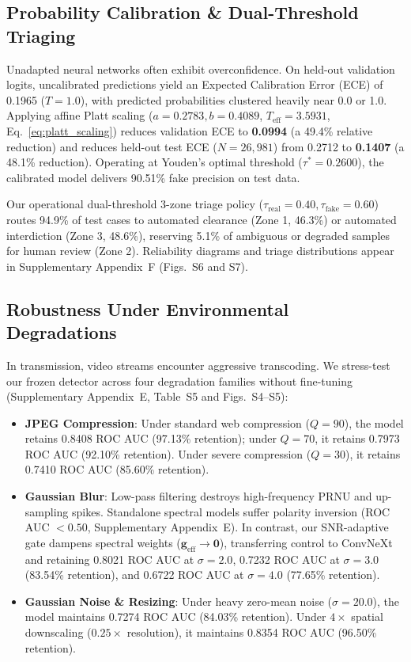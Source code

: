 \documentclass[10pt,twocolumn,letterpaper]{article}
\begin{document}
\subsection{Probability Calibration \& Dual-Threshold Triaging}
\label{sec:exp_calibration}

Unadapted neural networks often exhibit overconfidence. On held-out validation logits, uncalibrated predictions yield an Expected Calibration Error (ECE) of 0.1965 ($T = 1.0$), with predicted probabilities clustered heavily near 0.0 or 1.0. Applying affine Platt scaling ($a = 0.2783, b = 0.4089$, $T_{\mathrm{eff}} = 3.5931$, Eq.~\ref{eq:platt_scaling}) reduces validation ECE to \textbf{0.0994} (a 49.4\% relative reduction) and reduces held-out test ECE ($N = 26,981$) from 0.2712 to \textbf{0.1407} (a 48.1\% reduction). Operating at Youden's optimal threshold ($\tau^* = 0.2600$), the calibrated model delivers 90.51\% fake precision on test data.

Our operational dual-threshold 3-zone triage policy ($\tau_{\mathrm{real}} = 0.40, \tau_{\mathrm{fake}} = 0.60$) routes 94.9\% of test cases to automated clearance (Zone 1, 46.3\%) or automated interdiction (Zone 3, 48.6\%), reserving 5.1\% of ambiguous or degraded samples for human review (Zone 2). Reliability diagrams and triage distributions appear in Supplementary Appendix~F (Figs.~S6 and S7).

\subsection{Robustness Under Environmental Degradations}
\label{sec:exp_robustness}

In transmission, video streams encounter aggressive transcoding. We stress-test our frozen detector across four degradation families without fine-tuning (Supplementary Appendix~E, Table~S5 and Figs.~S4--S5):
\begin{itemize}
\item \textbf{JPEG Compression}: Under standard web compression ($Q = 90$), the model retains 0.8408 ROC AUC (97.13\% retention); under $Q = 70$, it retains 0.7973 ROC AUC (92.10\% retention). Under severe compression ($Q = 30$), it retains 0.7410 ROC AUC (85.60\% retention).
\item \textbf{Gaussian Blur}: Low-pass filtering destroys high-frequency PRNU and up-sampling spikes. Standalone spectral models suffer polarity inversion (ROC AUC $<0.50$, Supplementary Appendix~E). In contrast, our SNR-adaptive gate dampens spectral weights ($\mathbf{g}_{\mathrm{eff}} \to \mathbf{0}$), transferring control to ConvNeXt and retaining 0.8021 ROC AUC at $\sigma = 2.0$, 0.7232 ROC AUC at $\sigma = 3.0$ (83.54\% retention), and 0.6722 ROC AUC at $\sigma = 4.0$ (77.65\% retention).
\item \textbf{Gaussian Noise \& Resizing}: Under heavy zero-mean noise ($\sigma = 20.0$), the model maintains 0.7274 ROC AUC (84.03\% retention). Under $4\times$ spatial downscaling ($0.25\times$ resolution), it maintains 0.8354 ROC AUC (96.50\% retention).
\end{itemize}
\end{document}
